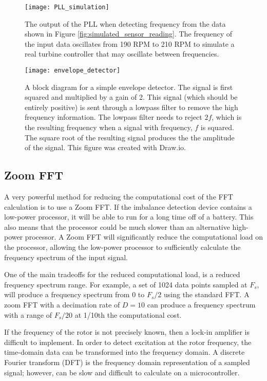 \begin{figure}
	\centering
	\texttt{[image: PLL\_simulation]}
	\decoRule
	\caption{The output of the PLL  when detecting frequency from the data shown in Figure \ref{fig:simulated_sensor_reading}.  The frequency of the input data oscillates from 190 RPM to 210 RPM to simulate a real turbine controller that may oscillate between frequencies.}
	\label{fig:PLL_simulation}
\end{figure}

\begin{figure}
	\centering
	\texttt{[image: envelope\_detector]}
	\decoRule
	\caption{A block diagram for a simple envelope detector.  The signal is first squared and multiplied by a gain of 2.  This signal (which should be entirely positive) is sent through a lowpass filter to remove the high frequency information.  The lowpass filter needs to reject $2f$, which is the resulting frequency when a signal with frequency, $f$ is squared.  The square root of the resulting signal produces the the amplitude of the signal.  This figure was created with Draw.io.}
	\label{fig:envelope_detector}
\end{figure}

\subsection{Zoom FFT}
A very powerful method for reducing the computational cost of the FFT calculation is to use a Zoom FFT.  If the imbalance detection device contains a low-power processor, it will be able to run for a long time off of a battery.  This also means that the processor could be much slower than an alternative high-power processor.  A Zoom FFT will significantly reduce the computational load on the processor, allowing the low-power processor to sufficiently calculate the frequency spectrum of the input signal.

One of the main tradeoffs for the reduced computational load, is a reduced frequency spectrum range.  For example, a set of 1024 data points sampled at $F_s$, will produce a frequency spectrum from $0$ to $F_s/2$ using the standard FFT.  A zoom FFT with a decimation rate of $D=10$ can produce a frequency spectrum with a range of $F_s/20$ at 1/10th the computational cost.

If the frequency of the rotor is not precisely known, then a lock-in amplifier is difficult to implement.  In order to detect excitation at the rotor frequency, the time-domain data can be transformed into the frequency domain.  A discrete Fourier transform (DFT) is the frequency domain representation of a sampled signal; however, can be slow and difficult to calculate on a microcontroller.

